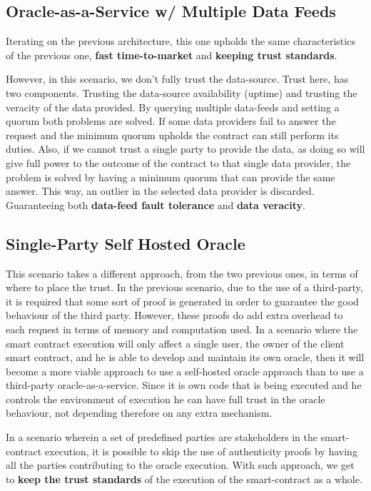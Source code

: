 \subsection{Oracle-as-a-Service w/ Multiple Data Feeds}\label{OaaS w/ MDF}
Iterating on the previous architecture, this one upholds the same characteristics of the previous one, \textbf{fast time-to-market} and \textbf{keeping trust standards}.

However, in this scenario, we don't fully trust the data-source. Trust here, has two components. Trusting the data-source availability (uptime) and trusting the veracity of the data provided. By querying multiple data-feeds and setting a quorum both problems are solved. If some data providers fail to answer the request and the minimum quorum upholds the contract can still perform its duties. Also, if we cannot trust a single party to provide the data, as doing so will give full power to the outcome of the contract to that single data provider, the problem is solved by having a minimum quorum that can provide the same answer. This way, an outlier in the selected data provider is discarded. Guaranteeing both \textbf{data-feed fault tolerance} and \textbf{data veracity}.

\subsection{Single-Party Self Hosted Oracle}\label{SP-SHO}
This scenario takes a different approach, from the two previous ones, in terms of where to place the trust. In the previous scenario, due to the use of a third-party, it is required that some sort of proof is generated in order to guarantee the good behaviour of the third party. However, these proofs do add extra overhead to each request in terms of memory and computation used. In a scenario where the smart contract execution will only affect a single user, the owner of the client smart contract, and he is able to develop and maintain its own oracle, then it will become a more viable approach to use a self-hosted oracle approach than to use a third-party oracle-as-a-service. Since it is own code that is being executed and he controls the environment of execution he can have full trust in the oracle behaviour, not depending therefore on any extra mechanism.


In a scenario wherein a set of predefined parties are stakeholders in the smart-contract execution, it is possible to skip the use of authenticity proofs by having all the parties contributing to the oracle execution. With such approach, we get to \textbf{keep the trust standards} of the execution of the smart-contract as a whole.

